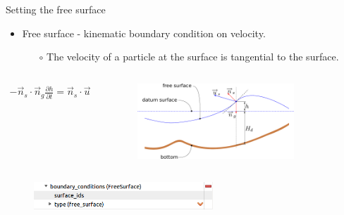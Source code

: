 \begin{frame}{Setting the free surface}
\begin{itemize}
  \item Free surface - kinematic boundary condition on velocity.
  \begin{itemize}
    \item[$\circ$] The velocity of a particle at the surface is tangential to the surface.
  \end{itemize}
\end{itemize}

\begin{columns}[l]
\column{2.5in}
  \begin{align*}
    -\overrightarrow{n}_s \cdot \overrightarrow{n}_g\frac{\partial h}{\partial t} = \overrightarrow{n}_s \cdot \overrightarrow{u}
  \end{align*}

\column{2.5in}
  \begin{figure}[htbp!]
   \centering
    \includegraphics[width=0.8\textwidth]{./tides_in_the_Mediterranean_Sea/figures/free_surface}
  \end{figure}
\end{columns}

\begin{figure}[htbp!]
 \centering
  \includegraphics[width=0.6\textwidth]{./tides_in_the_Mediterranean_Sea/figures/freesurface}
\end{figure}

\end{frame}

